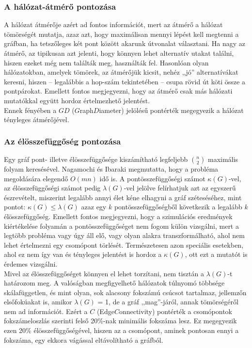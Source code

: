     \subsubsection{A hálózat-átmérő pontozása}
    A hálózat átmérője azért ad fontos információt, mert az átmérő a hálózat tömörségét mutatja, azaz azt, hogy maximálisan mennyi lépést kell megtenni a gráfban, ha tetszőleges két pont között akarunk útvonalat választani. Ha nagy az átmérő, az tipikusan azt jelenti, hogy könnyen lehet alternatív utakat találni, hiszen ezeket még nem találták meg, használták fel. Hasonlóan olyan hálózatokban, amelyek tömörek, az átmérőjük kicsit, nehéz ,,jó'' alternatívákat keresni, hiszen -- legalábbis a hop-szám tekintetében -- csupa rövid út köti össze a pontpárokat. Emellett fontos megjegyezni, hogy az átmérő csak más hálózati mutatókkal együtt hordoz értelmezhető jelentést.\\
    Ennek fényében a $GD$ ($G$raph$D$iameter) jelölésű pontérték megegyezik a hálózat tényleges átmérőjével.

    \subsubsection{Az élösszefüggőség pontozása}\label{elossze}
    Egy gráf pont- illetve élösszefüggősége kiszámítható legfeljebb $\binom{n}{2}$ maximális folyam keresésével. Nagamochi és Ibaraki megmutatta, hogy a probléma megoldására elegendő $O(mn)$ idő is\cite{Nagamochi96}. A pontösszefüggőségi számot $\kappa(G)$-vel, az élösszefüggőségi számot pedig $\lambda(G)$-vel jelölve felírhatjuk azt az egyszerű észrevételt, miszerint legalább annyi élet kéne elhagyni a gráf széteséséhez, mint pontot: $\kappa(G) \leq \lambda(G)$ azaz egy $k$ pontösszefüggőségből következik a legalább $k$ élösszefüggőség. Emellett fontos megjegyezni, hogy a szimulációs eredmények kiértékelése folyamán a pontösszefüggőséget nem fogom külön vizsgálni, mert a legtöbb probléma vagy úgy áll elő, vagy olyan alakra transzformálható, ahol nem lehet értelmezni egy csomópont törlését. Természetesen azon speciális esetekben, ahol ez nem így van és tényleges jelentést is hordoz a $\kappa(G)$, ott ezt a mutatót is érdemes vizsgálni.\\

    Mivel az élösszefüggőséget könnyen el lehet torzítani, nem tisztán a $\lambda(G)$-t határozom meg. A valóságban megfigyelhető hálózatok túlnyomó többsége skálafüggetlen, és mint olyan, sok alacsony fokszámú csúcsot tartalmaz, jellemzőn elsőfokúakat is, amikor $\lambda(G)$ = 1, de a gráf ,,mag''-járól, annak tömörségéről nem ad információt. Ezért a $C$ (Edge$C$onnectivity) pontérték a csomópontok fokszámeloszlás szerinti felső 20\%-nak minimális fokszáma lesz. Ez megegyezik ezen 20\% élösszefüggőségével, hiszen az a csomópont, aminek pontosan ennyi a fokszáma, egy ekkora vágással eltávolítható a gráfból.

